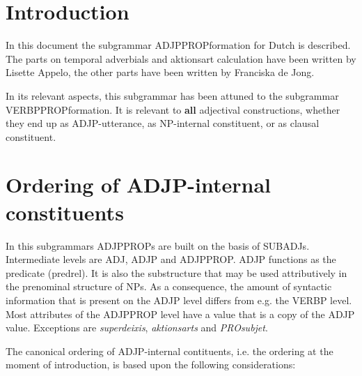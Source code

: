 
   \MakeRosTitle
%
%


\section{Introduction}
In this document the subgrammar ADJPPROPformation for Dutch is described.
The parts on temporal adverbials and aktionsart calculation have been written by 
Lisette Appelo, the other parts have been written by Franciska de Jong.

In its relevant aspects, this subgrammar has been attuned to the 
subgrammar VERBPPROPformation. It is relevant to {\bf all} 
adjectival constructions, 
whether they end up as ADJP-utterance, as NP-internal constituent, or as
clausal constituent.


\section{Ordering of ADJP-internal constituents}
In this subgrammars ADJPPROPs are built on the basis of SUBADJs. 
Intermediate levels are ADJ, ADJP and ADJPPROP. 
ADJP functions as the predicate (predrel).
It is also the substructure that may be used attributively in the 
prenominal structure of NPs. As a consequence, the amount of syntactic 
information that is present on the ADJP level differs from 
e.g. the VERBP level. Most attributes of the ADJPPROP level 
have a value that is a copy of the ADJP value.
Exceptions are {\em superdeixis}, {\em aktionsarts} and {\em PROsubjet}.

The canonical ordering of  ADJP-internal contituents, i.e. the ordering 
at the moment of introduction, is based upon the following considerations:

